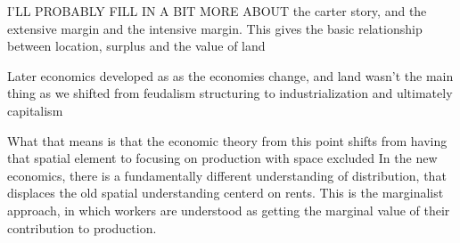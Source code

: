 \documentclass[]{article}
\begin{document}
I'LL PROBABLY FILL IN A BIT MORE ABOUT the carter story, and the extensive margin and  the intensive margin. 
This gives the basic relationship between location, surplus and the value of land %

Later economics developed as as the economies change, and land wasn't the main thing as we shifted from feudalism structuring to industrialization and ultimately capitalism

What that means is that the economic theory from this point shifts from having that spatial element to focusing on production with space excluded
In the new economics, there is a fundamentally different understanding of distribution, that displaces the old spatial understanding centerd on rents. 
This is the marginalist approach, in which workers are understood as getting the marginal value of their contribution to production.  %
\end{document}
